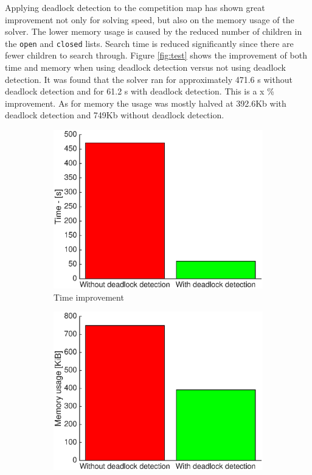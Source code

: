 Applying deadlock detection to the competition map has shown great improvement not only for solving speed, but also on the memory usage of the solver. 
The lower memory usage is caused by the reduced number of children in the \texttt{open} and \texttt{closed} lists.
Search time is reduced significantly since there are fewer children to search through. 
Figure \ref{fig:test} shows the improvement of both time and memory when using deadlock detection versus not using deadlock detection.
It was found that the solver ran for approximately 471.6 s without deadlock detection and for 61.2 s with deadlock detection. 
This is a x \% improvement.
As for memory the usage was mostly halved at 392.6Kb with deadlock detection and 749Kb without deadlock detection.
 
 \begin{figure}[H]
\centering
\begin{subfigure}{.5\textwidth}
  \centering
  \includegraphics[width=0.98\linewidth]{images/deadlockImprovement}
  \caption{Time improvement}
  \label{fig:sub1}
\end{subfigure}%
\begin{subfigure}{.5\textwidth}
  \centering
  \includegraphics[width=0.99\linewidth]{images/Memory_usage_1}

\end{subfigure}
\end{figure}
